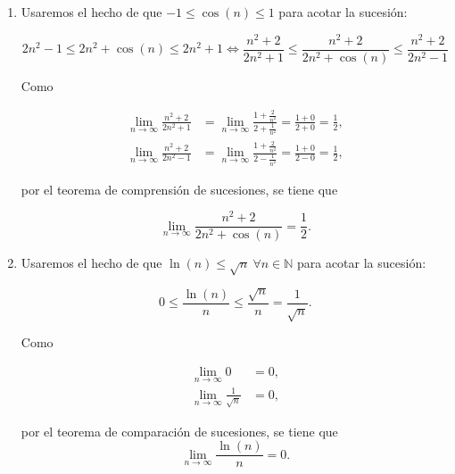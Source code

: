 \documentclass[
  spanish,
  a4paper,
]{scrreport}
\theoremstyle{definition}
\theoremstyle{remark}
\begin{document}
\begin{tcolorbox}[enhanced jigsaw, arc=.35mm, bottomrule=.15mm, bottomtitle=1mm, breakable, colback=white, colbacktitle=quarto-callout-tip-color!10!white, colframe=quarto-callout-tip-color-frame, coltitle=black, left=2mm, leftrule=.75mm, opacityback=0, opacitybacktitle=0.6, rightrule=.15mm, title=\textcolor{quarto-callout-tip-color}{\faLightbulb}\hspace{0.5em}{Solución}, titlerule=0mm, toprule=.15mm, toptitle=1mm]

\begin{enumerate}
\def\labelenumi{\alph{enumi}.}
\item
  Usaremos el hecho de que \(-1 \leq \cos(n) \leq 1\) para acotar la
  sucesión:

  \[
  2n^2 - 1 \leq 2n^2 + \cos(n) \leq 2n^2 + 1 
  \Leftrightarrow \frac{n^2+2}{2n^2+1} \leq \frac{n^2+2}{2n^2+\cos(n)} \leq \frac{n^2+2}{2n^2-1} 
  \]

  Como

  \begin{align*}
  \lim_{n\to \infty} \frac{n^2+2}{2n^2+1} &= \lim_{n\to \infty} \frac{1 + \frac{2}{n^2}}{2 + \frac{1}{n^2}} = \frac{1 + 0}{2 + 0} = \frac{1}{2}, \\
  \lim_{n\to \infty} \frac{n^2+2}{2n^2-1} &= \lim_{n\to \infty} \frac{1 + \frac{2}{n^2}}{2 - \frac{1}{n^2}} = \frac{1 + 0}{2 - 0} = \frac{1}{2},
  \end{align*}

  por el teorema de comprensión de sucesiones, se tiene que

  \[
  \lim_{n\to \infty} \frac{n^2+2}{2n^2+\cos(n)} = \frac{1}{2}.
  \]
\item
  Usaremos el hecho de que
  \(\ln(n) \leq \sqrt{n}\ \forall n \in \mathbb{N}\) para acotar la
  sucesión:

  \[
  0 \leq \frac{\ln(n)}{n} \leq \frac{\sqrt{n}}{n} = \frac{1}{\sqrt{n}}.
  \]

  Como

  \begin{align*}
  \lim_{n\to \infty} 0 &= 0, \\
  \lim_{n\to \infty} \frac{1}{\sqrt{n}} &= 0,
  \end{align*}

  por el teorema de comparación de sucesiones, se tiene que \[
  \lim_{n\to \infty} \frac{\ln(n)}{n} = 0.
  \]
\end{enumerate}

\end{tcolorbox}
\end{document}
